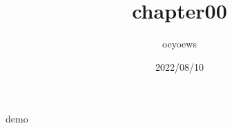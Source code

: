 \documentclass{article}
\title{chapter00}
\author{oeyoews}
\date{2022/08/10}
\begin{document}
\maketitle

demo
\end{document}
